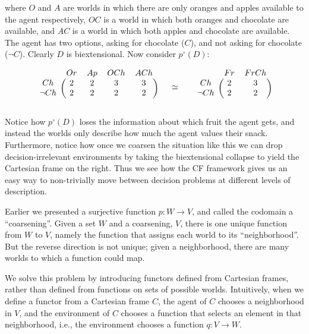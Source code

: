 \documentclass{article}
\begin{document}
\noindent where $O$ and $A$ are worlds in which there are only oranges and apples available to the agent respectively, $OC$ is a world in which both oranges and chocolate are available, and $AC$ is a world in which both apples and chocolate are available. The agent has two options, asking for chocolate ($C$), and not asking for chocolate ($\neg C$). Clearly $D$ is biextensional. Now consider $p^{\circ}(D)$: 

\bigskip
\[
\begin{blockarray}{ccccc}
& Or & Ap & OCh & ACh\\
\begin{block}{c(cccc)}
Ch & 2 & 2 & 3 & 3\\
\neg Ch & 2 & 2 & 2 & 2\\
\end{block}
\end{blockarray} 
\hspace{0.5cm}
\simeq 
\hspace{0.5cm}
\begin{blockarray}{ccc}
& Fr & FrCh \\
\begin{block}{c(cc)}
Ch & 2 & 3\\
\neg Ch & 2 & 2\\
\end{block}
\end{blockarray}\ 
\]

Notice how $p^{\circ}(D)$ loses the information about which fruit the agent gets, and instead the worlds only describe how much the agent values their snack. Furthermore, notice how once we coarsen the situation like this we can drop decision-irrelevant environments by taking the biextensional collapse to yield the Cartesian frame on the right. Thus we see how the CF framework gives us an easy way to non-trivially move between decision problems at different levels of description.

Earlier we presented a surjective function $p: W \to V$, and called the codomain a ``coarsening''. Given a set $W$ and a coarsening, $V$, there is one unique function from $W$ to $V$, namely the function that assigns each world to its ``neighborhood''. But the reverse direction is not unique; given a neighborhood, there are many worlds to which a function could map.

We solve this problem by introducing functors defined from Cartesian frames, rather than defined from functions on sets of possible worlds.
Intuitively, when we define a functor from a Cartesian frame $C$, the agent of $C$ chooses a neighborhood in $V$, and the environment of $C$ chooses a function that selects an element in that neighborhood, i.e., the environment chooses a function $q : V \to W$.
\end{document}
